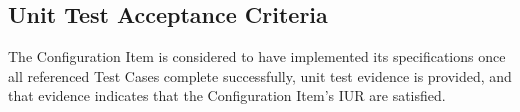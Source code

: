 \subsection{Unit Test Acceptance Criteria}
The Configuration Item is considered to have implemented its specifications
once all referenced Test Cases complete successfully, unit test evidence is
provided, and that evidence indicates that the Configuration Item's IUR are
satisfied.
